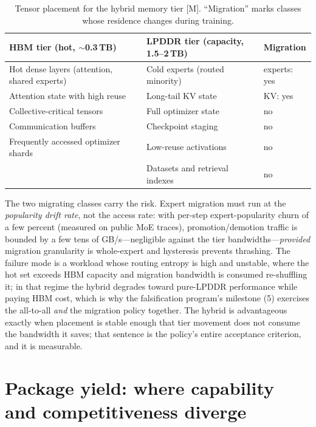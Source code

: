 \begin{table}[htbp]
  \centering
  \small
  \caption{Tensor placement for the hybrid memory tier [M]. ``Migration'' marks classes whose residence changes during training.}
  \label{tab:placement}
  \begin{tabular}{p{52mm}p{52mm}p{22mm}}
    \toprule
    HBM tier (hot, $\sim$0.3\,TB) & LPDDR tier (capacity, 1.5--2\,TB) & Migration \\
    \midrule
    Hot dense layers (attention, shared experts) & Cold experts (routed minority) & experts: yes \\
    Attention state with high reuse & Long-tail KV state & KV: yes \\
    Collective-critical tensors & Full optimizer state & no \\
    Communication buffers & Checkpoint staging & no \\
    Frequently accessed optimizer shards & Low-reuse activations & no \\
    & Datasets and retrieval indexes & no \\
    \bottomrule
  \end{tabular}
\end{table}

The two migrating classes carry the risk. Expert migration must run at the \emph{popularity drift rate}, not the access rate: with per-step expert-popularity churn of a few percent (measured on public MoE traces), promotion/demotion traffic is bounded by a few tens of GB/s---negligible against the tier bandwidths---\emph{provided} migration granularity is whole-expert and hysteresis prevents thrashing. The failure mode is a workload whose routing entropy is high and unstable, where the hot set exceeds HBM capacity and migration bandwidth is consumed re-shuffling it; in that regime the hybrid degrades toward pure-LPDDR performance while paying HBM cost, which is why the falsification program's milestone (5) exercises the all-to-all \emph{and} the migration policy together. The hybrid is advantageous exactly when placement is stable enough that tier movement does not consume the bandwidth it saves; that sentence is the policy's entire acceptance criterion, and it is measurable.

\section{Package yield: where capability and competitiveness diverge}
\label{sec:pkgyield}

